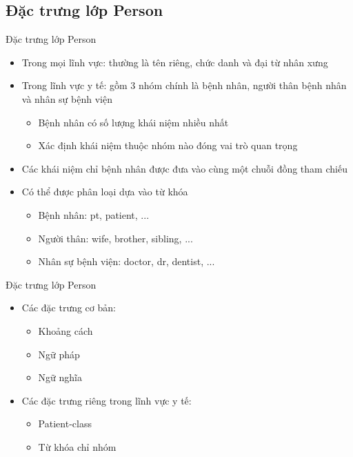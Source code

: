 \subsection*{Đặc trưng lớp Person}
\begin{frame}{Đặc trưng lớp Person}
\putlogo
\begin{itemize}
	\item Trong {\color{red} mọi lĩnh vực}: thường là tên riêng, chức danh và đại từ nhân xưng
	\item Trong {\color{red} lĩnh vực y tế}: gồm 3 nhóm chính là bệnh nhân, người thân bệnh nhân và nhân sự bệnh viện
	\begin{itemize}
		\item Bệnh nhân có số lượng khái niệm nhiều nhất
		\item Xác định khái niệm thuộc nhóm nào đóng vai trò quan trọng
	\end{itemize}
	\item Các khái niệm chỉ bệnh nhân được đưa vào cùng một chuỗi đồng tham chiếu
	\item Có thể được phân loại dựa vào {\color{red} từ khóa}
	\begin{itemize}
		\item Bệnh nhân: pt, patient, ...
		\item Người thân: wife, brother, sibling, ...
		\item Nhân sự bệnh viện: doctor, dr, dentist, ...
	\end{itemize}
\end{itemize}
\end{frame}

\begin{frame}{Đặc trưng lớp Person}
\putlogo
\begin{itemize}
	\item Các đặc trưng {\color{red} cơ bản}:
	\begin{itemize}
		\item Khoảng cách
		\item Ngữ pháp
		\item Ngữ nghĩa
	\end{itemize}		
	\item Các đặc trưng riêng trong {\color{red} lĩnh vực y tế}:
	\begin{itemize}
		\item Patient-class
		\item Từ khóa chỉ nhóm
	\end{itemize}
\end{itemize}
\end{frame}

